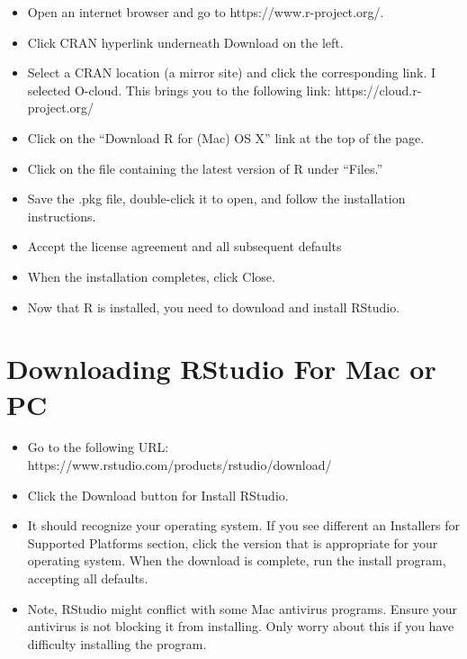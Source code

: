 \documentclass[
  letterpaper,
  DIV=11,
  numbers=noendperiod]{scrreprt}
\providecommand{\tightlist}{%
  \setlength{\itemsep}{0pt}\setlength{\parskip}{0pt}}\usepackage{longtable,booktabs,array}
\begin{document}
\begin{itemize}
\tightlist
\item
  Open an internet browser and go to https://www.r-project.org/.
\item
  Click CRAN hyperlink underneath Download on the left.
\item
  Select a CRAN location (a mirror site) and click the corresponding
  link. I selected O-cloud. This brings you to the following link:
  https://cloud.r-project.org/
\item
  Click on the ``Download R for (Mac) OS X'' link at the top of the
  page.
\item
  Click on the file containing the latest version of R under ``Files.''
\item
  Save the .pkg file, double-click it to open, and follow the
  installation instructions.
\item
  Accept the license agreement and all subsequent defaults
\item
  When the installation completes, click Close.
\item
  Now that R is installed, you need to download and install RStudio.
\end{itemize}

\section{Downloading RStudio For Mac or
PC}\label{downloading-rstudio-for-mac-or-pc}

\begin{itemize}
\tightlist
\item
  Go to the following URL:
  https://www.rstudio.com/products/rstudio/download/
\item
  Click the Download button for Install RStudio.
\item
  It should recognize your operating system. If you see different an
  Installers for Supported Platforms section, click the version that is
  appropriate for your operating system. When the download is complete,
  run the install program, accepting all defaults.
\item
  Note, RStudio might conflict with some Mac antivirus programs. Ensure
  your antivirus is not blocking it from installing. Only worry about
  this if you have difficulty installing the program.
\end{itemize}
\end{document}
